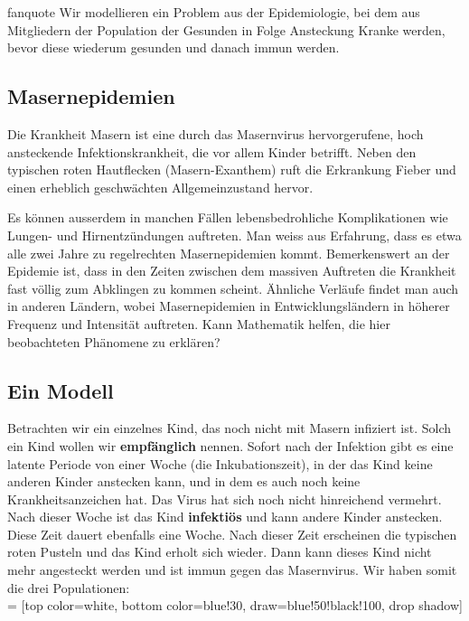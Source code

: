 \documentclass[%
<<<<<<< Updated upstream
<<<<<<< Updated upstream
11pt,%
twoside,%
titlepage,%
german,%
headsepline%
]{scrartcl}
\begin{document}
\begin{uebenv}{fanquote}
Wir modellieren ein Problem aus der Epidemiologie, bei dem aus Mitgliedern der Population der Gesunden in Folge Ansteckung Kranke werden, bevor diese wiederum gesunden und danach immun werden.

\subsection{Masernepidemien}
Die Krankheit Masern ist eine durch das Masernvirus hervorgerufene, hoch ansteckende Infektionskrankheit, die vor allem Kinder betrifft. Neben den typischen roten Hautflecken (Masern-Exanthem) ruft die Erkrankung Fieber und einen erheblich geschwächten Allgemeinzustand hervor.

Es können ausserdem in manchen Fällen lebensbedrohliche Komplikationen wie Lun\-gen- und Hirnentzündungen auftreten. Man weiss aus Erfahrung, dass es etwa alle zwei Jahre zu regelrechten Masernepidemien kommt. Bemerkenswert an der Epidemie ist, dass in den Zeiten zwischen dem massiven Auftreten die Krankheit fast völlig zum Abklingen zu kommen scheint. Ähnliche Verläufe findet man auch in anderen Ländern, wobei Masernepidemien in Entwicklungsländern in höherer Frequenz und Intensität auftreten. Kann Mathematik helfen, die hier beobachteten Phänomene zu erklären?

\subsection{Ein Modell}
Betrachten wir ein einzelnes Kind, das noch nicht mit Masern infiziert ist. Solch ein Kind wollen wir \textbf{empfänglich} nennen. Sofort nach der Infektion gibt es eine latente Periode von einer Woche (die Inkubationszeit), in der das Kind keine anderen Kinder anstecken kann, und in dem es auch noch keine Krankheitsanzeichen hat. Das Virus hat sich noch nicht hinreichend vermehrt. Nach dieser Woche ist das Kind \textbf{infektiös} und kann andere Kinder anstecken. Diese Zeit dauert ebenfalls eine Woche. Nach dieser Zeit erscheinen die typischen roten Pusteln und das Kind erholt sich wieder. Dann kann dieses Kind nicht mehr angesteckt werden und ist immun gegen das Masernvirus. Wir haben somit die drei Populationen:\\

 = [top color=white, bottom color=blue!30, 
                            draw=blue!50!black!100, drop shadow]


\end{uebenv}
\end{document}
